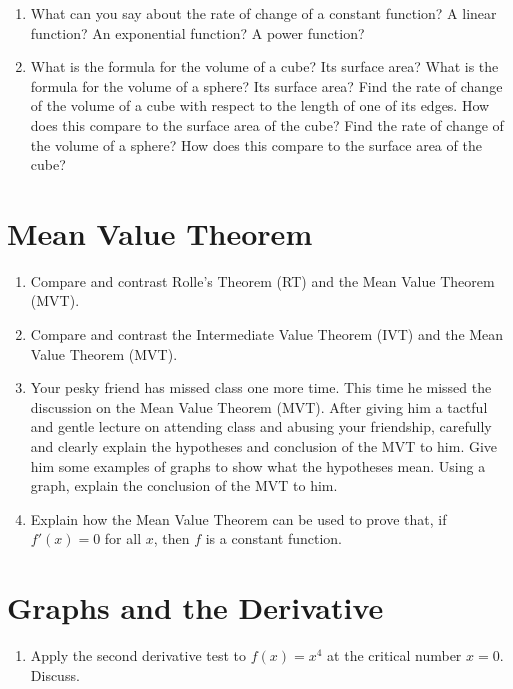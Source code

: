 \begin{enumerate}
\item  What can you say about the rate of change of a constant function?  A linear function?  An exponential function?  A power function?  \cite{SMo}

\item  What is the formula for the volume of a cube?  Its surface area?  What is the formula for the volume of a sphere?  Its surface area?  Find the rate of change of the volume of a cube with respect to the length of one of its edges.  How does this compare to the surface area of the cube?  Find the rate of change of the volume of a sphere?  How does this compare to the surface area of the cube?

\end{enumerate}\section{Mean Value Theorem}\begin{enumerate}

\item  Compare and contrast Rolle's Theorem (RT) and the Mean Value Theorem (MVT).  

\item  Compare and contrast the Intermediate Value Theorem (IVT) and the Mean Value Theorem (MVT).  

\item  Your pesky friend has missed class one more time.  This time he missed the discussion on the Mean Value Theorem (MVT).  After giving him a tactful and gentle lecture on attending class and abusing your friendship, carefully and clearly explain the hypotheses and conclusion of the MVT to him.  Give him some examples of graphs to show what the hypotheses mean.  Using a graph, explain the conclusion of the MVT to him.

\item  Explain how the Mean Value Theorem can be used to prove that, if $f'\left( x \right) = 0$ for all $x$, then $f$ is a constant function.

 \end{enumerate}\section{Graphs and the Derivative}\begin{enumerate}

\item  Apply the second derivative test to $f(x) = x^4$ at the critical number $x = 0$.  Discuss.


\end{enumerate}
